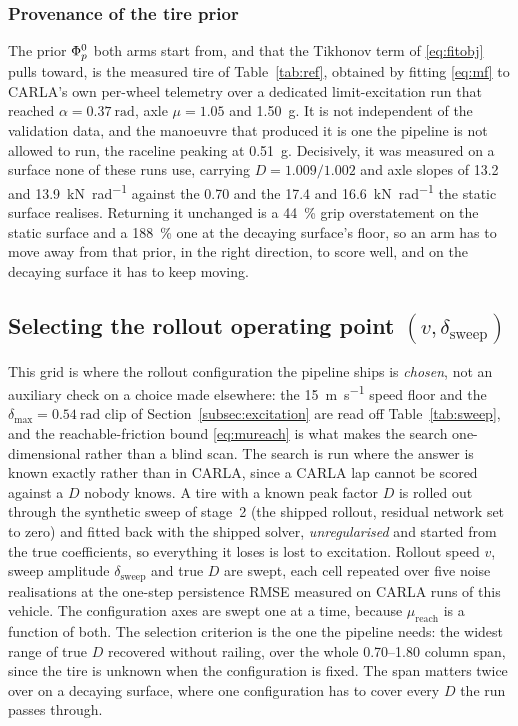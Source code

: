 \subsubsection{Provenance of the tire prior}
\label{subsubsec:priorprovenance}
The prior $\Phi_{p}^{0}$ both arms start from, and that the Tikhonov term of
\eqref{eq:fitobj} pulls toward, is the measured tire of Table~\ref{tab:ref},
obtained by fitting \eqref{eq:mf} to CARLA's own per-wheel telemetry over a
dedicated limit-excitation run that reached $\alpha=\SI{0.37}{\radian}$, axle
$\mu=\num{1.05}$ and \SI{1.50}{\g}. It is not independent of the validation
data, and the manoeuvre that produced it is one the pipeline is not allowed to
run, the raceline peaking at \SI{0.51}{\g}. Decisively, it was measured on a
surface none of these runs use, carrying $D=\num{1.009}/\num{1.002}$ and axle
slopes of \num{13.2} and \SI{13.9}{\kilo\newton\per\radian} against the
\num{0.70} and the \num{17.4} and \SI{16.6}{\kilo\newton\per\radian} the static
surface realises. Returning it unchanged is a \SI{44}{\percent} grip
overstatement on the static surface and a \SI{188}{\percent} one at the
decaying surface's floor, so an arm has to move away from that prior, in the
right direction, to score well, and on the decaying surface it has to keep
moving.

\subsection{Selecting the rollout operating point $(v,\delta_{\mathrm{sweep}})$}
\label{subsec:sweep}

This grid is where the rollout configuration the pipeline ships is
\emph{chosen}, not an auxiliary check on a choice made elsewhere: the
\SI{15}{\meter\per\second} speed floor and the
$\delta_{\max}=\SI{0.54}{\radian}$ clip of Section~\ref{subsec:excitation} are
read off Table~\ref{tab:sweep}, and the reachable-friction bound
\eqref{eq:mureach} is what makes the search one-dimensional rather than a blind
scan. The search is run where the answer is known exactly rather than in CARLA,
since a CARLA lap cannot be scored against a $D$ nobody knows. A tire with a
known peak factor $D$ is rolled out through the synthetic sweep of stage~2 (the
shipped rollout, residual network set to zero) and fitted back with the shipped
solver, \emph{unregularised} and started from the true coefficients, so
everything it loses is lost to excitation. Rollout speed $v$, sweep amplitude
$\delta_{\mathrm{sweep}}$ and true $D$ are swept, each cell repeated over five
noise realisations at the one-step persistence RMSE measured on CARLA runs of
this vehicle. The configuration axes are swept one at a time, because
$\mu_{\mathrm{reach}}$ is a function of both. The selection criterion is the one
the pipeline needs: the widest range of true $D$ recovered without railing, over
the whole \numrange{0.70}{1.80} column span, since the tire is unknown when the
configuration is fixed. The span matters twice over on a decaying surface, where
one configuration has to cover every $D$ the run passes through.

